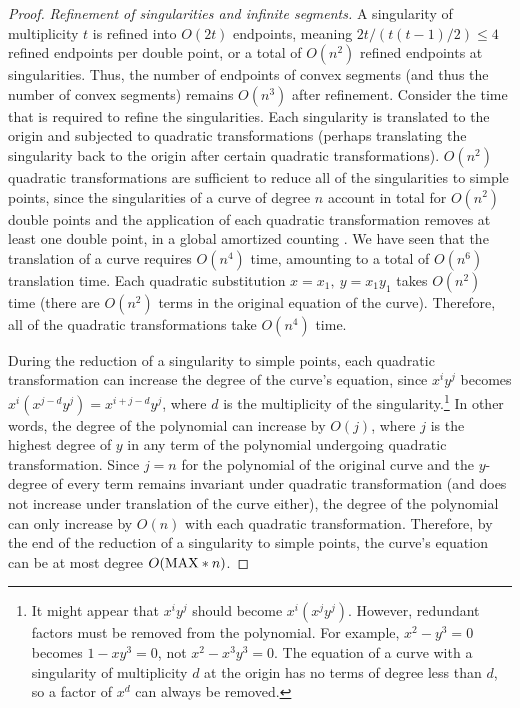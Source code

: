 \begin{proof}
{\em Refinement of singularities and infinite segments.}
%
A singularity of multiplicity $t$ is refined into $O(2t)$ endpoints, meaning
$2t / (t(t-1) / 2) \leq 4$ refined endpoints per double point,
or a total of $O(n^{2})$ refined endpoints at singularities.
Thus, the number of endpoints of convex segments 
(and thus the number of convex segments) remains $O(n^{3})$ after refinement.
Consider the time that is required to refine the singularities.
Each singularity is translated to the origin and subjected to quadratic transformations
(perhaps translating the singularity back to the origin after certain quadratic 
transformations).
$O(n^{2})$ quadratic transformations are sufficient to reduce all of the singularities 
to simple points, since the singularities of a curve of degree $n$ account in total for 
$O(n^{2})$ double points and the application of each quadratic transformation 
removes at least one double point, in a global amortized counting \cite{abba3}. 
We have seen that the translation of a curve requires $O(n^{4})$ time, 
amounting to a total of $O(n^{6})$ translation time. 
Each quadratic substitution $x = x_{1},\ y = x_{1}y_{1}$ takes $O(n^{2})$ time 
(there are $O(n^2)$ terms in the original equation of the curve).
Therefore, all of the quadratic transformations take $O(n^{4})$ time.

During the reduction of a singularity to simple points, each quadratic
transformation can increase the degree of the curve's equation, since
$x^{i}y^{j}$ becomes $x^{i}(x^{j-d}y^{j}) = x^{i+j-d}y^{j}$, where $d$ is the 
multiplicity of the singularity.\footnote{It might appear that 
	$x^{i}y^{j}$ should become $x^{i}(x^{j}y^{j})$.  However,  
	redundant factors must be removed from the polynomial.
	For example, $x^{2} - y^{3} = 0$
	becomes $1-xy^{3} = 0$, not $x^{2} - x^{3}y^{3} = 0$.
	The equation of a curve with a singularity of multiplicity $d$ 
	at the origin has no terms of degree less than $d$, so a factor of $x^{d}$ can
	always be removed.}
In other words, the degree of the polynomial can increase by $O(j)$, where
$j$ is the highest degree of $y$ in any term of the polynomial undergoing 
quadratic transformation. 
Since $j=n$ for the polynomial of the original curve and the $y$-degree of every term
remains invariant under quadratic transformation (and does not increase under
translation of the curve either), the degree of the polynomial can only increase
by $O(n)$ with each quadratic transformation.
Therefore, by the end of the reduction of a singularity to simple points, 
the curve's equation can be at most degree $O({\rm MAX} * n)$.


\end{proof}
